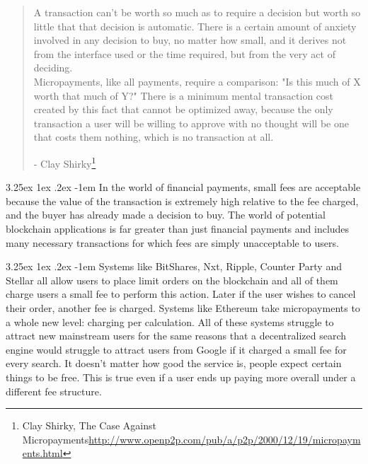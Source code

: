 \documentclass{article}
\makeatletter
\renewcommand\paragraph{\@startsection{paragraph}{5}{\z@}%
  {3.25ex \@plus1ex \@minus.2ex}%
  {-1em}%
  {\normalfont\normalsize\bfseries}}
\makeatother
\begin{document}
				\begin{quote}
						A transaction can't be worth so much as to require a decision but worth so little that that decision is automatic. There is a certain amount of anxiety involved in any decision to buy, no matter how small, and it derives not from the interface used or the time required, but from the very act of deciding.\\

						Micropayments, like all payments, require a comparison: "Is this much of X worth that much of Y?" There is a minimum mental transaction cost created by this fact that cannot be optimized away, because the only transaction a user will be willing to approve with no thought will be one that costs them nothing, which is no transaction at all.

						- Clay Shirky\protect\footnote{Clay Shirky, The Case Against Micropayments\newline\url{http://www.openp2p.com/pub/a/p2p/2000/12/19/micropayments.html}}\\
				\end{quote}

				\paragraph{}
					In the world of financial payments, small fees are acceptable because the value of the transaction is extremely high relative to the fee charged, and the buyer has already made a decision to buy. The world of potential blockchain applications is far greater than just financial payments and includes many necessary transactions for which fees are simply unacceptable to users.

				\paragraph{}
					Systems like BitShares, Nxt, Ripple, Counter Party and Stellar all allow users to place limit orders on the blockchain and all of them charge users a small fee to perform this action. Later if the user wishes to cancel their order, another fee is charged. Systems like Ethereum take micropayments to a whole new level: charging per calculation. All of these systems struggle to attract new mainstream users for the same reasons that a decentralized search engine would struggle to attract users from Google if it charged a small fee for every search. It doesn't matter how good the service is, people expect certain things to be free. This is true even if a user ends up paying more overall under a different fee structure.
\end{document}
